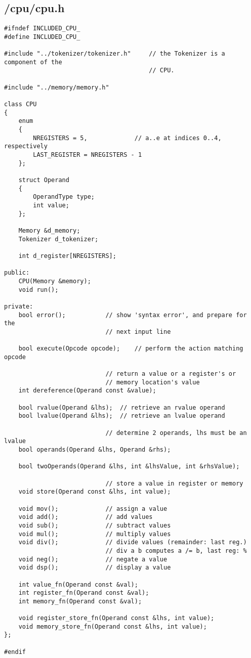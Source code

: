 \documentclass{article}
\begin{document}
\subsection*{/cpu/cpu.h}
\begin{verbatim}
#ifndef INCLUDED_CPU_
#define INCLUDED_CPU_

#include "../tokenizer/tokenizer.h"     // the Tokenizer is a component of the
                                        // CPU.

#include "../memory/memory.h"

class CPU
{
    enum 
    {
        NREGISTERS = 5,             // a..e at indices 0..4, respectively
        LAST_REGISTER = NREGISTERS - 1
    };

    struct Operand
    {
        OperandType type;
        int value;
    };
        
    Memory &d_memory;
    Tokenizer d_tokenizer;

    int d_register[NREGISTERS];

public:
    CPU(Memory &memory);
    void run();

private:
    bool error();           // show 'syntax error', and prepare for the 
                            // next input line

    bool execute(Opcode opcode);    // perform the action matching opcode

                            // return a value or a register's or 
                            // memory location's value
    int dereference(Operand const &value);

    bool rvalue(Operand &lhs);  // retrieve an rvalue operand
    bool lvalue(Operand &lhs);  // retrieve an lvalue operand

                            // determine 2 operands, lhs must be an lvalue
    bool operands(Operand &lhs, Operand &rhs);

    bool twoOperands(Operand &lhs, int &lhsValue, int &rhsValue);

                            // store a value in register or memory
    void store(Operand const &lhs, int value);

    void mov();             // assign a value
    void add();             // add values
    void sub();             // subtract values
    void mul();             // multiply values
    void div();             // divide values (remainder: last reg.)
                            // div a b computes a /= b, last reg: %
    void neg();             // negate a value
    void dsp();             // display a value

    int value_fn(Operand const &val);
    int register_fn(Operand const &val);
    int memory_fn(Operand const &val);

    void register_store_fn(Operand const &lhs, int value);
    void memory_store_fn(Operand const &lhs, int value);
};
        
#endif
\end{verbatim}
\end{document}
